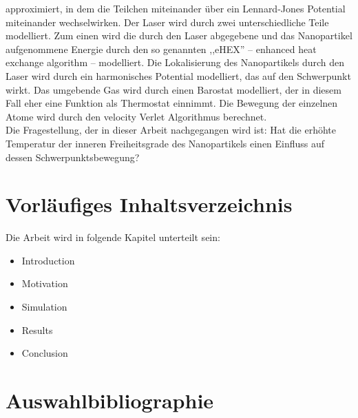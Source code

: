 \documentclass[12pt]{article}
\begin{document}
approximiert, in dem die Teilchen miteinander \"uber ein Lennard-Jones Potential miteinander wechselwirken. Der Laser wird durch zwei unterschiedliche
Teile modelliert. Zum einen wird die durch den Laser abgegebene und das Nanopartikel aufgenommene Energie durch den so genannten ,,eHEX'' -- enhanced
heat exchange algorithm -- modelliert. Die Lokalisierung des Nanopartikels durch den Laser wird durch ein harmonisches Potential modelliert, das auf
den Schwerpunkt wirkt. Das umgebende Gas wird durch einen Barostat modelliert, der in diesem Fall eher eine Funktion als Thermostat einnimmt. Die
Bewegung der einzelnen Atome wird durch den velocity Verlet Algorithmus berechnet.\\
Die Fragestellung, der in dieser Arbeit nachgegangen wird ist: Hat die erh\"ohte Temperatur der inneren Freiheitsgrade des Nanopartikels einen
Einfluss auf dessen Schwerpunktsbewegung?

\section{Vorl\"aufiges Inhaltsverzeichnis}
Die Arbeit wird in folgende Kapitel unterteilt sein:
\begin{itemize}
    \item{Introduction}
    \item{Motivation}
    \item{Simulation}
    \item{Results}
    \item{Conclusion}
\end{itemize}

\section{Auswahlbibliographie}
\nocite{*} 


\end{document}
